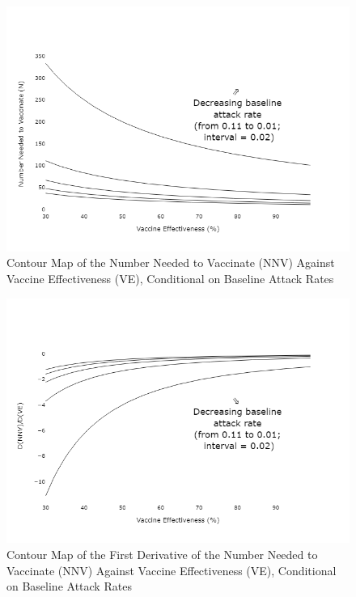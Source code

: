 \documentclass[12pt]{article}
\begin{document}
\begin{figure}[H]
	\centering
	\caption{Contour Map of the Number Needed to Vaccinate (NNV) Against Vaccine Effectiveness (VE), Conditional on Baseline Attack Rates}
	\includegraphics[scale=0.6]{VEMethod_NNVmap_NNV.png}
\end{figure}
\begin{figure}[H]
	\centering
	\caption{Contour Map of the First Derivative of the Number Needed to Vaccinate (NNV) Against Vaccine Effectiveness (VE), Conditional on Baseline Attack Rates}
	\includegraphics[scale=0.6]{VEMethod_NNVmap_Dnnv.png}
\end{figure}
\end{document}
